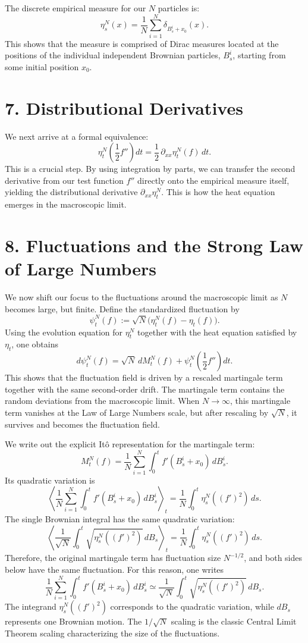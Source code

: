 \documentclass[11pt]{article}
\theoremstyle{definition}
\theoremstyle{remark}
\begin{document}
The discrete empirical measure for our $N$ particles is:
\[
\eta_s^N(x)=\frac{1}{N}\sum_{i=1}^N \delta_{B_s^i+x_0}(x).
\]
This shows that the measure is comprised of Dirac measures located at the positions of the individual independent Brownian particles, $B_s^i$, starting from some initial position $x_0$.

\section*{7. Distributional Derivatives}
We next arrive at a formal equivalence:
\[
\eta_t^N\!\left(\frac{1}{2}f''\right)dt=\frac{1}{2}\,\partial_{xx}\eta_t^N(f)\,dt.
\]
This is a crucial step. By using integration by parts, we can transfer the second derivative from our test function $f''$ directly onto the empirical measure itself, yielding the distributional derivative $\partial_{xx}\eta_t^N$. This is how the heat equation emerges in the macroscopic limit.

\section*{8. Fluctuations and the Strong Law of Large Numbers}
We now shift our focus to the fluctuations around the macroscopic limit as $N$ becomes large, but finite. Define the standardized fluctuation by
\[
\psi_t^N(f):=\sqrt{N}\bigl(\eta_t^N(f)-\eta_t(f)\bigr).
\]
Using the evolution equation for $\eta_t^N$ together with the heat equation satisfied by $\eta_t$, one obtains
\[
d\psi_t^N(f)=\sqrt{N}\,dM_t^N(f)+\psi_t^N\!\left(\frac{1}{2}f''\right)dt.
\]
This shows that the fluctuation field is driven by a rescaled martingale term together with the same second-order drift. The martingale term contains the random deviations from the macroscopic limit. When $N\to\infty$, this martingale term vanishes at the Law of Large Numbers scale, but after rescaling by $\sqrt{N}$, it survives and becomes the fluctuation field.

We write out the explicit It\^o representation for the martingale term:
\[
M_t^N(f)=\frac{1}{N}\sum_{i=1}^N \int_0^t f'(B_s^i+x_0)\,dB_s^i.
\]
Its quadratic variation is
\[
\left\langle
\frac{1}{N}\sum_{i=1}^N \int_0^t f'(B_s^i+x_0)\,dB_s^i
\right\rangle_t
=
\frac{1}{N}\int_0^t \eta_s^N((f')^2)\,ds.
\]
The single Brownian integral has the same quadratic variation:
\[
\left\langle
\frac{1}{\sqrt{N}}\int_0^t \sqrt{\eta_s^N((f')^2)}\,dB_s
\right\rangle_t
=
\frac{1}{N}\int_0^t \eta_s^N((f')^2)\,ds.
\]
Therefore, the original martingale term has fluctuation size $N^{-1/2}$, and both sides below have the same fluctuation. For this reason, one writes
\[
\frac{1}{N}\sum_{i=1}^N \int_0^t f'(B_s^i+x_0)\,dB_s^i \simeq \frac{1}{\sqrt{N}}\int_0^t \sqrt{\eta_s^N((f')^2)}\,dB_s.
\]
The integrand $\eta_s^N((f')^2)$ corresponds to the quadratic variation, while $dB_s$ represents one Brownian motion. The $1/\sqrt{N}$ scaling is the classic Central Limit Theorem scaling characterizing the size of the fluctuations.
\end{document}

